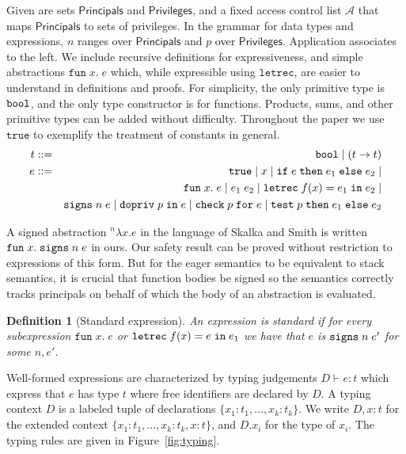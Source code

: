 \documentclass[submission,copyright,creativecommons]{eptcs}
\newcommand{\ifthenelse}[3]{\IF\;#1\;\THEN\;#2\;\ELSE\;#3}
\newcommand{\enable}[2]{\ENABLE\;#1\;\IN\;#2}
\newcommand{\chk}[2]{\CHK\;#1\;\FOR\;#2}
\newcommand{\test}[3]{\TEST\;#1\;\THEN\;#2\;\ELSE\;#3}
\newcommand{\signs}[2]{\SIGNS\;#1\;#2}
\newcommand{\BOOL}{\mbox{\texttt{bool}}}
\newcommand{\ELSE}{\mbox{\texttt{else}}}
\newcommand{\IF}{\mbox{\texttt{if}}}
\newcommand{\FOR}{\mbox{\texttt{for}}}
\newcommand{\IN}{\mbox{\texttt{in}}}
\newcommand{\LET}{\mbox{\texttt{let}}}
\newcommand{\REC}{{\texttt{rec}}}
\newcommand{\THEN}{{\texttt{then}}}
\newcommand{\TRUE}{{\texttt{true}}}
\newcommand{\A}{\mathcal{A}}
\newcommand{\proves}{\vdash}
\newcommand{\recdecl}[3]{\REC\;#1(#2) = #3}
\newcommand{\PRINC}{{\mathsf{Principals}}}
\newcommand{\PRIV}{{\mathsf{Privileges}}}
\newcommand{\ENABLE}{\mbox{\texttt{dopriv}}}
\newcommand{\CHK}{\mbox{\texttt{check}}}
\newcommand{\TEST}{\mbox{\texttt{test}}}
\newcommand{\SIGNS}{\mbox{\texttt{signs}}}
\newcommand{\letdecl}[2]{\LET#1\;\IN\;#2}
\newcommand{\LAM}[2]{{\mathtt{fun}\; #1.\; #2}}
\newcommand{\D}{D} \newcommand{\ty}{t} \renewcommand{\th}{\theta}
\newcommand{\n}{n} \newcommand{\p}{p} \newcommand{\Ps}{\Pi} \newcommand{\h}{h}
\newtheorem{definition}[theorem]{Definition}
\begin{document}
Given are sets $\PRINC$ and $\PRIV$, and a fixed access control list
$\A$ that maps $\PRINC$ to sets of privileges.  In the grammar for
data types and expressions, $\n$ ranges over $\PRINC$ and $\p$ over
$\PRIV$.  Application associates to the left.  We include recursive
definitions for expressiveness, and simple abstractions $\LAM{x}{e}$
which, while expressible using $\mathtt{letrec}$, are easier to
understand in definitions and proofs.  For simplicity, the only
primitive type is $\BOOL$, and the only type constructor is for
functions.  Products, sums, and other primitive types can be added
without difficulty. Throughout the paper we use $\TRUE$ to exemplify the treatment of constants in general.
\begin{eqnarray*}
\ty &::=& \BOOL \mid (\ty\to\ty)\\
e &::=& \TRUE \mid x \mid \ifthenelse{e}{e_1}{e_2} \mid \\
& &     \LAM{x}{e} \mid e_1\;e_2
          \mid \letdecl{\recdecl{f}{x}{e_1}}{e_2} \mid \\
& &       \signs{\n}{e} \mid \enable{\p}{e} \mid \chk{\p}{e} \mid 
          \test{\p}{e_1}{e_2} 
\end{eqnarray*}

A signed abstraction $^{\n}\lambda x.e$ in the language of Skalka and
Smith is written $\LAM{x}{\signs{\n}{e}}$ in ours.  Our
safety result can be proved without restriction to expressions of this
form.  But for the eager semantics to be equivalent to stack
semantics, it is crucial that function bodies be signed so the
semantics correctly tracks principals on behalf of which the body of
an abstraction is evaluated.

\begin{definition}[Standard expression]\label{def:std}
An expression is standard if for every subexpression
$\LAM{x}{e}$ or $\letdecl{\recdecl{f}{x}{e}}{e_1}$ we have that $e$ is
$\signs{\n}{e'}$ for some $\n,e'$.
\end{definition}



Well-formed expressions are characterized by typing judgements
$\D\proves e:\ty$ which express that $e$ has type $\ty$ where free
identifiers are declared by $D$.  A typing context $D$ is a labeled
tuple of declarations $\{x_1:\ty_1,\ldots,x_k:\ty_k\}$. We write
$D,x:\ty$ for the extended context $\{x_1:\ty_1,\ldots,x_k:\ty_k,x:\ty
\}$, and $D.x_i$ for the type of $x_i$.  The typing rules are given in
Figure~\ref{fig:typing}.
\end{document}

